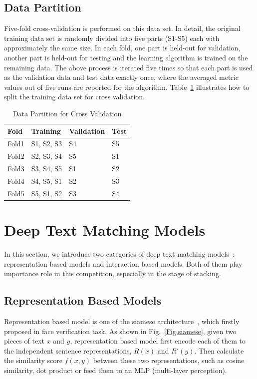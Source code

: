 \documentclass[12pt]{article}
\begin{document}
\subsection{Data Partition}

Five-fold cross-validation is performed on this data set. In detail, the original training data set is randomly divided into five parts (S1-S5) each with approximately the same size. In each fold, one part is held-out for validation, another part is held-out for testing and the learning algorithm is trained on the remaining data. The above process is iterated five times so that each part is used as the validation data and test data exactly once, where the averaged metric values out of five runs are reported for the algorithm. Table~{\ref{tab:data-part-cv}} illustrates how to split the training data set for cross validation.

\begin{table}[ht]
\centering
\caption{Data Partition for Cross Validation}
    \label{tab:data-part-cv}
\begin{tabular}{p{3cm}p{3cm}p{3cm}p{3cm}}
\hline
 Fold & Training	& Validation        & Test \\
\hline\hline
Fold1 & S1, S2, S3 & S4 & S5 \\ \hline
Fold2	&	S2, S3, S4	&	S5	&		S1 \\ \hline	
Fold3	&	S3, S4, S5	&	S1	&		S2	\\ \hline
Fold4	&	S4, S5, S1	&	S2	&		S3	\\ \hline
Fold5	&	S5, S1, S2	&	S3	&		S4 \\ \hline
\end{tabular}
\end{table}

\section{Deep Text Matching Models}
In this section, we introduce two categories of deep text matching models~\cite{}: representation based models and interaction based models. Both of them play importance role in this competition, especially in the stage of stacking.

\subsection{Representation Based Models}

Representation based model is one of the siamese architecture~\cite{}, which firstly proposed in face verification task. As shown in Fig.~\ref{Fig.siamese}, given two pieces of text $x$ and $y$, representation based model first encode each of them to the independent sentence representations, $R(x)$ and $R'(y)$. Then calculate the similarity score $f(x,y)$ between these two representations, such as cosine similarity, dot product or feed them to an MLP (multi-layer perception).
\end{document}
